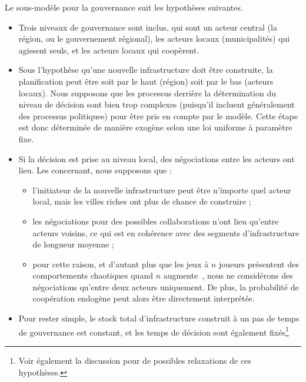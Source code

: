 {\begin{itemize}
\end{itemize}
}{
Le sous-modèle pour la gouvernance suit les hypothèses suivantes.
\begin{itemize}
	\item Trois niveaux de gouvernance sont inclus, qui sont un acteur central (la région, ou le gouvernement régional), les acteurs locaux (municipalités) qui agissent seuls, et les acteurs locaux qui coopèrent.%
	\item Sous l'hypothèse qu'une nouvelle infrastructure doit être construite, la planification peut être soit par le haut (région) soit par le bas (acteurs locaux). Nous supposons que les processus derrière la détermination du niveau de décision sont bien trop complexes (puisqu'il incluent généralement des processus politiques) pour être pris en compte par le modèle. Cette étape est donc déterminée de manière exogène selon une loi uniforme à paramètre fixe.%
	\item Si la décision est prise au niveau local, des négociations entre les acteurs ont lieu. Les concernant, nous supposons que :
	\begin{itemize}
		\item l'initiateur de la nouvelle infrastructure peut être n'importe quel acteur local, mais les villes riches ont plus de chance de construire ;
		\item les négociations pour des possibles collaborations n'ont lieu qu'entre acteurs voisins, ce qui est en cohérence avec des segments d'infrastructure de longueur moyenne ;
		\item pour cette raison, et d'autant plus que les jeux à $n$ joueurs présentent des comportements chaotiques quand $n$ augmente~\cite{2016arXiv161208111S}, nous ne considérons des négociations qu'entre deux acteurs uniquement. De plus, la probabilité de coopération endogène peut alors être directement interprétée.
	\end{itemize}
	\item Pour rester simple, le stock total d'infrastructure construit à un pas de temps de gouvernance est constant, et les temps de décision sont également fixés\footnote{Voir également la discussion pour de possibles relaxations de ces hypothèses.}
\end{itemize}
}





